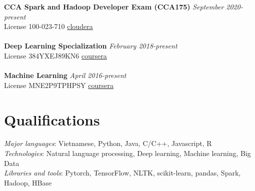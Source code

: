 \documentclass[11pt,a4paper,roman]{article}
\begin{document}
\textbf{CCA Spark and Hadoop Developer Exam (CCA175)}
\hfill
\textit{September 2020-present} \\
License 100-023-710
\hfill
\href{http://certification.cloudera.com/verify/user}{cloudera}
\\\\
\textbf{Deep Learning Specialization}
\hfill
\textit{February 2018-present} \\
License 384YXEJ89KN6
\hfill
\href{https://www.coursera.org/account/accomplishments/verify/384YXEJ89KN6}{coursera}
\\\\
\textbf{Machine Learning}
\hfill
\textit{April 2016-present} \\
License MNE2P9TPHPSY
\hfill
\href{https://www.coursera.org/account/accomplishments/verify/MNE2P9TPHPSY}{coursera} 

\section{Qualifications}

\textit{Major languages}: Vietnamese, Python, Java, C/C++, Javascript, R
\\
\textit{Technologies}: Natural language processing, Deep learning, Machine learning, Big Data
\\
\textit{Libraries and tools}: Pytorch, TensorFlow, NLTK, scikit-learn, pandas, Spark, Hadoop, HBase
\end{document}
